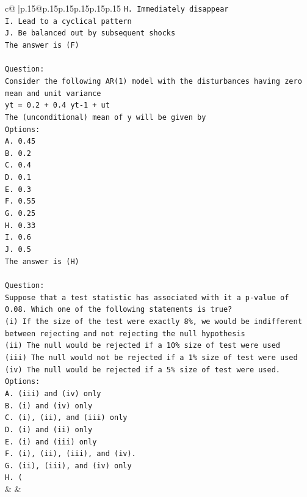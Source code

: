 \documentclass{article}
\begin{document}
{\begin{supertabular}{c@{$\;$}|p{.15\linewidth}@{}p{.15\linewidth}p{.15\linewidth}p{.15\linewidth}p{.15\linewidth}p{.15\linewidth}}
{{{\texttt{H. Immediately disappear} \\
\texttt{I. Lead to a cyclical pattern} \\
\texttt{J. Be balanced out by subsequent shocks} \\
\texttt{The answer is (F)} \\
\\ 
\texttt{Question:} \\
\texttt{Consider the following AR(1) model with the disturbances having zero mean and unit variance} \\
\texttt{yt = 0.2 + 0.4 yt{-}1 + ut} \\
\texttt{The (unconditional) mean of y will be given by} \\
\texttt{Options:} \\
\texttt{A. 0.45} \\
\texttt{B. 0.2} \\
\texttt{C. 0.4} \\
\texttt{D. 0.1} \\
\texttt{E. 0.3} \\
\texttt{F. 0.55} \\
\texttt{G. 0.25} \\
\texttt{H. 0.33} \\
\texttt{I. 0.6} \\
\texttt{J. 0.5} \\
\texttt{The answer is (H)} \\
\\ 
\texttt{Question:} \\
\texttt{Suppose that a test statistic has associated with it a p{-}value of 0.08. Which one of the following statements is true?} \\
\texttt{(i) If the size of the test were exactly 8\%, we would be indifferent between rejecting and not rejecting the null hypothesis} \\
\texttt{(ii) The null would be rejected if a 10\% size of test were used} \\
\texttt{(iii) The null would not be rejected if a 1\% size of test were used} \\
\texttt{(iv) The null would be rejected if a 5\% size of test were used.} \\
\texttt{Options:} \\
\texttt{A. (iii) and (iv) only} \\
\texttt{B. (i) and (iv) only} \\
\texttt{C. (i), (ii), and (iii) only} \\
\texttt{D. (i) and (ii) only} \\
\texttt{E. (i) and (iii) only} \\
\texttt{F. (i), (ii), (iii), and (iv).} \\
\texttt{G. (ii), (iii), and (iv) only} \\
\texttt{H. (} \\
            }
        }
    }
    & & \\ \\


\end{supertabular}}
\end{document}
